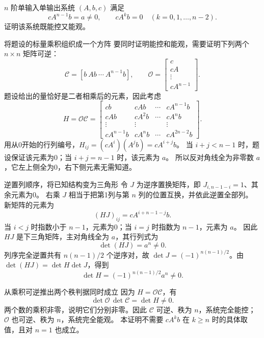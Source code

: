 \documentclass[11pt]{article}
\begin{document}
\begin{problem}[原题 10]
$n$ 阶单输入单输出系统 $(A,b,c)$ 满足
\[
cA^{n-1}b=a\ne0,\qquad cA^kb=0\quad(k=0,1,\ldots,n-2).
\]
证明该系统既能控又能观。
\end{problem}
\begin{solution}
\begin{proofstep}{将题设的标量乘积组织成一个方阵}
要同时证明能控和能观，需要证明下列两个 $n\times n$ 矩阵可逆：
\[
\mathcal C=[b\ Ab\ \cdots\ A^{n-1}b],\qquad
\mathcal O=\begin{bmatrix}c\\cA\\\vdots\\cA^{n-1}\end{bmatrix}.
\]
题设给出的量恰好是二者相乘后的元素，因此考虑
\[
H=\mathcal O\mathcal C
=\begin{bmatrix}
cb&cAb&\cdots&cA^{n-1}b\\
cAb&cA^2b&\cdots&cA^nb\\
\vdots&\vdots&&\vdots\\
cA^{n-1}b&cA^nb&\cdots&cA^{2n-2}b
\end{bmatrix}.
\]
用从0开始的行列编号，$H_{ij}=(cA^i)(A^jb)=cA^{i+j}b$。
当 $i+j<n-1$ 时，题设保证该元素为0；当 $i+j=n-1$ 时，该元素为 $a$。
所以反对角线全为非零数 $a$，它左上侧全为0，右下侧元素无需知道。
\end{proofstep}

\begin{proofstep}{逆置列顺序，将已知结构变为三角形}
令 $J$ 为逆序置换矩阵，即 $J_{i,n-1-i}=1$、其余元素为0。
右乘 $J$ 相当于把第1列与第 $n$ 列的位置互换，并依此逆置全部列。
新矩阵的元素为
\[
(HJ)_{ij}=cA^{i+n-1-j}b.
\]
当 $i<j$ 时指数小于 $n-1$，元素为0；当 $i=j$ 时指数为 $n-1$，元素为 $a$。
因此 $HJ$ 是下三角矩阵，主对角线全为 $a$，其行列式为
\[
\det(HJ)=a^n\ne0.
\]
列序完全逆置共有 $n(n-1)/2$ 个逆序对，故
$\det J=(-1)^{n(n-1)/2}$。由 $\det(HJ)=\det H\det J$，得到
\[
\det H=(-1)^{n(n-1)/2}a^n\ne0.
\]
\end{proofstep}

\begin{proofstep}{从乘积可逆推出两个秩判据同时成立}
因为 $H=\mathcal O\mathcal C$，有
\[
\det\mathcal O\,\det\mathcal C=\det H\ne0.
\]
两个数的乘积非零，说明它们分别非零。因此 $\mathcal C$ 可逆、秩为 $n$，系统完全能控；
$\mathcal O$ 也可逆、秩为 $n$，系统完全能观。
本证明不需要 $cA^kb$ 在 $k\ge n$ 时的具体取值，且对 $n=1$ 也成立。
\end{proofstep}
\end{solution}
\end{document}
